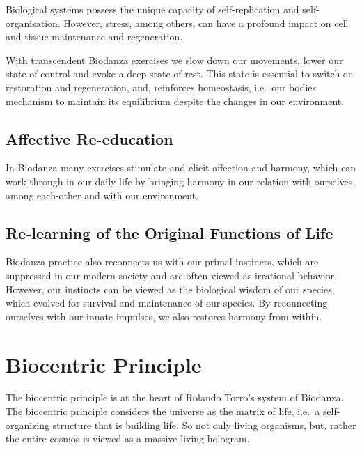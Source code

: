 \documentclass[
  11pt,
]{book}
\begin{document}
Biological systems possess the unique capacity of self-replication and self-organisation. However, stress, among others, can have a profound impact on cell and tissue maintenance and regeneration.

With transcendent Biodanza exercises we slow down our movements, lower our state of control and evoke a deep state of rest. This state is essential to switch on restoration and regeneration, and, reinforces homeostasis, i.e.~our bodies mechanism to maintain its equilibrium despite the changes in our environment.

\hypertarget{affective-re-education}{%
\subsection{Affective Re-education}\label{affective-re-education}}

In Biodanza many exercises stimulate and elicit affection and harmony, which can work through in our daily life by bringing harmony in our relation with ourselves, among each-other and with our environment.

\hypertarget{re-learning-of-the-original-functions-of-life}{%
\subsection{Re-learning of the Original Functions of Life}\label{re-learning-of-the-original-functions-of-life}}

Biodanza practice also reconnects us with our primal instincts, which are suppressed in our modern society and are often viewed as irrational behavior.
However, our instincts can be viewed as the biological wisdom of our species, which evolved for survival and maintenance of our species. By reconnecting ourselves with our innate impulses, we also restores harmony from within.

\hypertarget{sectionBiocentricPrinciple}{%
\section{Biocentric Principle}\label{sectionBiocentricPrinciple}}

The biocentric principle is at the heart of Rolando Torro's system of Biodanza. The biocentric principle considers the universe as the matrix of life, i.e.~a self-organizing structure that is building life. So not only living organisms, but, rather the entire cosmos is viewed as a massive living hologram.
\end{document}
